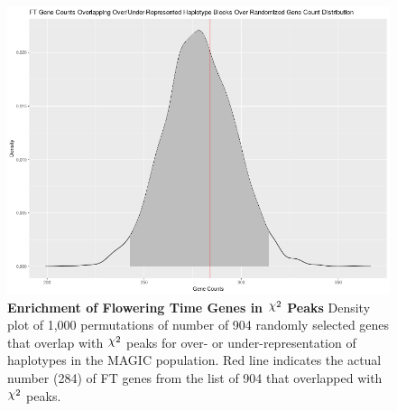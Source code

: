 \documentclass[article,9pt,twocolumn,twoside]{rilabRxiv}
\DeclareRobustCommand{\rchi}{{\mathpalette\irchi\relax}}
\newcommand{\irchi}[2]{\raisebox{\depth}{$#1\chi$}} %
\begin{document}
\begin{figure}[ht]
\centering
\includegraphics[width=\linewidth]{figures/ft_overlap_enrichment_density.png}
\caption{\textbf{Enrichment of Flowering Time Genes in $\rchi^2$ Peaks} Density plot of 1,000 permutations of number of 904 randomly selected genes that overlap with $\rchi^2$ peaks for over- or under-representation of haplotypes in the MAGIC population. Red line indicates the actual number (284) of FT genes from the list of 904 that overlapped with $\rchi^2$ peaks.}
\label{fig:supfigure4}
\end{figure}

\pagebreak


\end{document}
